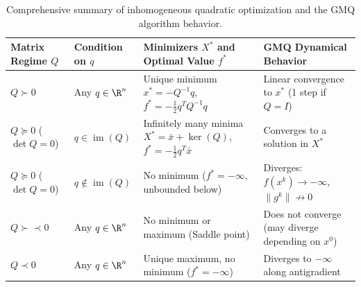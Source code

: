 \begin{table}[H]
\centering
\small
\renewcommand{\arraystretch}{1.35}
\begin{tabularx}{\textwidth}{l >{\raggedright\arraybackslash}p{2.6cm} Y >{\raggedright\arraybackslash}p{3.1cm}}
\toprule
\textbf{Matrix Regime $Q$} & \textbf{Condition on $q$} & \textbf{Minimizers $X^*$ and Optimal Value $f^*$} & \textbf{GMQ Dynamical Behavior} \\
\midrule
$Q \succ 0$ & Any $q \in \R^n$ & Unique minimum $x^* = -Q^{-1}q$, $f^* = -\frac{1}{2}q^T Q^{-1}q$ & Linear convergence to $x^*$ (1 step if $Q=I$) \\
$Q \succeq 0$ ($\det Q = 0$) & $q \in \operatorname{im}(Q)$ & Infinitely many minima $X^* = \bar{x} + \ker(Q)$, $f^* = -\frac{1}{2}q^T \bar{x}$ & Converges to a solution in $X^*$ \\
$Q \succeq 0$ ($\det Q = 0$) & $q \notin \operatorname{im}(Q)$ & No minimum ($f^* = -\infty$, unbounded below) & Diverges: $f(x^k) \to -\infty$, $\|g^k\| \not\to 0$ \\
$Q \succ\prec 0$ & Any $q \in \R^n$ & No minimum or maximum (Saddle point) & Does not converge (may diverge depending on $x^0$) \\
$Q \prec 0$ & Any $q \in \R^n$ & Unique maximum, no minimum ($f^* = -\infty$) & Diverges to $-\infty$ along antigradient \\
\bottomrule
\end{tabularx}
\caption{Comprehensive summary of inhomogeneous quadratic optimization and the GMQ algorithm behavior.}
\label{tab:synopsis-quadratic-gmq-en}
\end{table}
